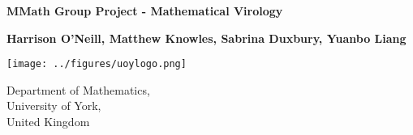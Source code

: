 \begin{titlepage}

    \begin{center}

        \vspace*{1.5cm}

        \textbf{\huge MMath Group Project - Mathematical Virology} 
        
        \vspace*{1.5cm}
        
        \textbf{Harrison O'Neill, Matthew Knowles, Sabrina Duxbury, Yuanbo Liang}

        \vspace*{1.5cm}
    
        \texttt{[image: ../figures/uoylogo.png]}
        
        \vspace*{1.5cm}
        
        Department of Mathematics, \\
        University of York, \\
        United Kingdom \\
    \end{center}
    
\end{titlepage}